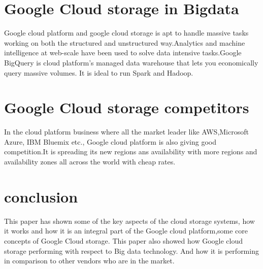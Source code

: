 \documentclass[9pt,twocolumn,twoside]{styles/osajnl}
\begin{document}
\section{Google Cloud storage in Bigdata}

Google cloud platform and google cloud storage is apt to handle massive tasks working on both the structured and unstructured way.Analytics and machine intelligence at web-scale have been used to solve data intensive tasks.Google BigQuery \cite{www-google-bigquery} is cloud platform's  managed data warehouse that lets you economically query massive volumes. It is ideal to run Spark and Hadoop.

\section{Google Cloud storage competitors}
In the cloud platform business where all the market leader like AWS,Microsoft Azure, IBM Bluemix etc., Google cloud platform is also giving good competition.It is spreading its new regions ans availability with more regions and availability zones all across the world with cheap rates. 

\section{conclusion}
This paper has shown some of the key aspects of the cloud storage systems, how it works and how it is an integral part of the Google cloud platform,some core concepts of Google Cloud storage. This paper also showed how Google cloud storage performing with respect to Big data technology. And how it is performing in comparison to  other vendors who are in the market.


\end{document}

